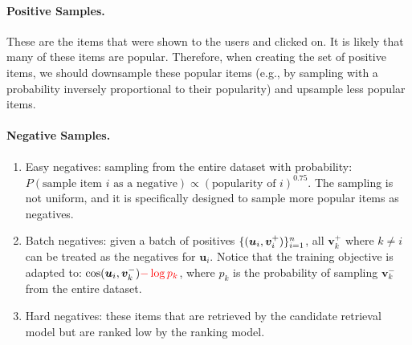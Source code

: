         \paragraph{Positive Samples.}
            These are the items that were shown to the users and clicked on.
            It is likely that many of these items are popular.
            Therefore, when creating the set of positive items, we should downsample these popular items (e.g., by sampling with a probability inversely proportional to their popularity) and upsample less popular items.

        \paragraph{Negative Samples.}
                \begin{enumerate}
                    \item Easy negatives: sampling from the entire dataset with probability: $P(\text{sample item $i$ as a negative}) \propto (\text{popularity of $i$})^{0.75}$. The sampling is not uniform, and it is specifically designed to sample more popular items as negatives.
                    
                    \item Batch negatives: given a batch of positives $\{ (\bm{u}_i, \bm{v}_i^+) \}_{i=1}^n$, all $\bm{v}_k^+$ where $k \ne i$ can be treated as the negatives for $\bm{u}_i$. 
                    Notice that the training objective is adapted to: $\text{cos}(\bm{u}_i, \bm{v}_k^-) \textcolor{red}{- \log p_k}$, where $p_k$ is the probability of sampling $\bm{v}_k^-$ from the entire dataset.
                    \item Hard negatives: these items that are retrieved by the candidate retrieval model but are ranked low by the ranking model. 
                \end{enumerate}
    

